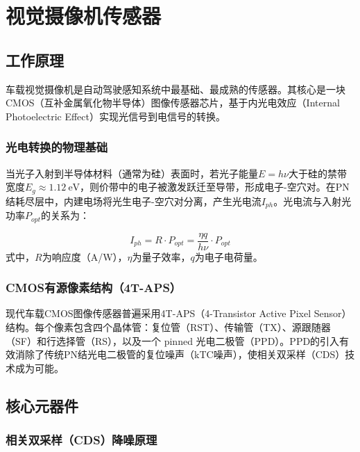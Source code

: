\documentclass[12pt,a4paper,openany,UTF8]{ctexbook}
\begin{document}
\clearpage

\chapter{视觉摄像机传感器}

\section{工作原理}

车载视觉摄像机是自动驾驶感知系统中最基础、最成熟的传感器。其核心是一块CMOS（互补金属氧化物半导体）图像传感器芯片，基于内光电效应（Internal Photoelectric Effect）实现光信号到电信号的转换。

\subsection{光电转换的物理基础}

当光子入射到半导体材料（通常为硅）表面时，若光子能量$E = h\nu$大于硅的禁带宽度$E_g \approx 1.12\ \text{eV}$，则价带中的电子被激发跃迁至导带，形成电子-空穴对。在PN结耗尽层中，内建电场将光生电子-空穴对分离，产生光电流$I_{ph}$。光电流与入射光功率$P_{opt}$的关系为：

\begin{equation}\label{eq:photocurrent}
I_{ph} = R \cdot P_{opt} = \frac{\eta q}{h\nu} \cdot P_{opt}
\end{equation}
式中，$R$为响应度（A/W），$\eta$为量子效率，$q$为电子电荷量。

\subsection{CMOS有源像素结构（4T-APS）}

现代车载CMOS图像传感器普遍采用4T-APS（4-Transistor Active Pixel Sensor）结构。每个像素包含四个晶体管：复位管（RST）、传输管（TX）、源跟随器（SF）和行选择管（RS），以及一个 pinned 光电二极管（PPD）。PPD的引入有效消除了传统PN结光电二极管的复位噪声（kTC噪声），使相关双采样（CDS）技术成为可能。

\section{核心元器件}

\subsection{相关双采样（CDS）降噪原理}
\end{document}
